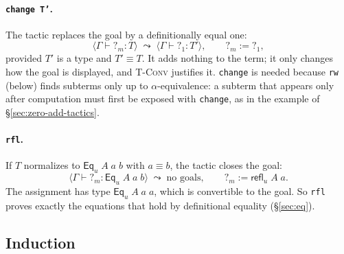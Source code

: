 \documentclass[acmsmall,screen,nonacm]{acmart}
\newcommand{\conv}{\equiv}
\newcommand{\Eq}[1]{\mathsf{Eq}_{#1}}
\newcommand{\refl}[1]{\mathsf{refl}_{#1}}
\newcommand{\hole}[1]{?_{#1}}
\begin{document}
\paragraph{\texttt{change T'}.}
The tactic replaces the goal by a definitionally equal one:
\[
\langle \Gamma \vdash \hole{m} : T \rangle \;\leadsto\; \langle \Gamma \vdash \hole{1} : T' \rangle,
\qquad
\hole{m} \mathrel{:=} \hole{1},
\]
provided $T'$ is a type and $T' \conv T$.
It adds nothing to the term; it only changes how the goal is displayed, and \textsc{T-Conv} justifies it.
\texttt{change} is needed because \texttt{rw} (below) finds subterms only up to $\alpha$-equivalence:
a subterm that appears only after computation must first be exposed with \texttt{change}, as in the example of \S\ref{sec:zero-add-tactics}.

\paragraph{\texttt{rfl}.}
If $T$ normalizes to $\Eq{u}\;A\;a\;b$ with $a \conv b$, the tactic closes the goal:
\[
\langle \Gamma \vdash \hole{m} : \Eq{u}\;A\;a\;b \rangle \;\leadsto\; \text{no goals},
\qquad
\hole{m} \mathrel{:=} \refl{u}\;A\;a.
\]
The assignment has type $\Eq{u}\;A\;a\;a$, which is convertible to the goal.
So \texttt{rfl} proves exactly the equations that hold by definitional equality (\S\ref{sec:eq}).

\subsection{Induction}
\end{document}
